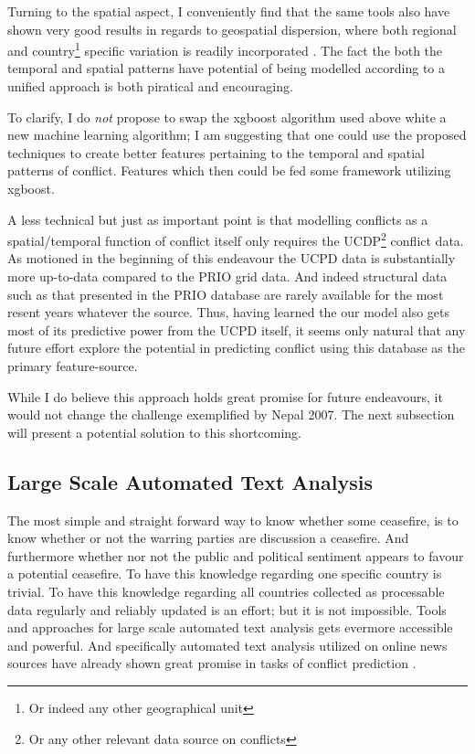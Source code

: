 \documentclass[a4paper]{article}
\begin{document}
Turning to the spatial aspect, I conveniently find that the same tools also have shown very good results in regards to geospatial dispersion, where both regional and country\footnote{Or indeed any other geographical unit} specific variation is readily incorporated \citep{gelfand2003spatial, gelfand2012hierarchical, gelfand2016spatial}. The fact the both the temporal and spatial patterns have potential of being modelled according to a unified approach is both piratical and encouraging.\par

To clarify, I do \emph{not} propose to swap the xgboost algorithm used above white a new machine learning algorithm; I am suggesting that one could use the proposed techniques to create better features pertaining to the temporal and spatial patterns of conflict. Features which then could be fed some framework utilizing xgboost.\par

A less technical but just as important point is that modelling conflicts as a spatial/temporal function of conflict itself only requires the UCDP\footnote{Or any other relevant data source on conflicts}  conflict data. As motioned in the beginning of this endeavour the UCPD data is substantially more up-to-data compared to the PRIO grid data. And indeed structural data such as that presented in the PRIO database are rarely available for the most resent years whatever the source. Thus, having learned the our model also gets most of its predictive power from the UCPD itself, it seems only natural that any future effort explore the potential in predicting conflict using this database as the primary feature-source.\par

While I do believe this approach holds great promise for future endeavours, it would not change the challenge exemplified by Nepal 2007. The next subsection will present a potential solution to this shortcoming.\par

\subsection{Large Scale Automated Text Analysis}

The most simple and straight forward way to know whether some ceasefire, is to know whether or not the warring parties are discussion a ceasefire. And furthermore whether nor not the public and political sentiment appears to favour a potential ceasefire. To have this knowledge regarding one specific country is trivial. To have this knowledge regarding all countries collected as  processable data regularly and reliably updated is an effort; but it is not impossible. Tools and approaches for large scale automated text analysis gets evermore accessible and powerful. And specifically automated text analysis utilized on online news sources have already shown great promise in tasks of conflict prediction \citep{chadefaux_2014, mueller_2016}. 
\end{document}
